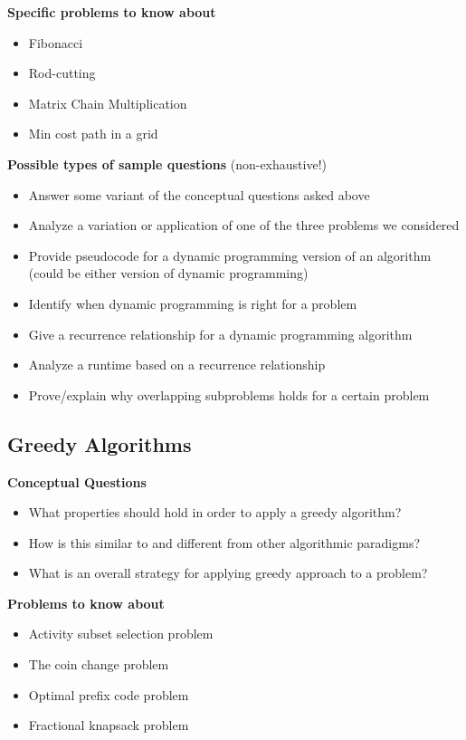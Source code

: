 \documentclass[11  pt]{exam}
\begin{document}
	\textbf{Specific problems to know about}
	\begin{itemize}
		\item Fibonacci
		\item Rod-cutting
		\item Matrix Chain Multiplication
		\item Min cost path in a grid
	\end{itemize}
	
	\textbf{Possible types of sample questions} (non-exhaustive!)
	\begin{itemize}
				\item Answer some variant of the conceptual questions asked above
				\item Analyze a variation or application of one of the three problems we considered
		\item Provide pseudocode for a dynamic programming version of an algorithm (could be either version of dynamic programming)
		\item Identify when dynamic programming is right for a problem
		\item Give a recurrence relationship for a dynamic programming algorithm
		\item Analyze a runtime based on a recurrence relationship
		\item Prove/explain why overlapping subproblems holds for a certain problem
	\end{itemize}
	
	\subsection{Greedy Algorithms}
	\textbf{Conceptual Questions}
	\begin{itemize}
		\item What properties should hold in order to apply a greedy algorithm?
		\item How is this similar to and different from other algorithmic paradigms?
		\item What is an overall strategy for applying greedy approach to a problem?
	\end{itemize}
	
	\textbf{Problems to know about}
	\begin{itemize}
		\item Activity subset selection problem
		\item The coin change problem
		\item Optimal prefix code problem
		\item Fractional knapsack problem
	\end{itemize}
	
\end{document}
